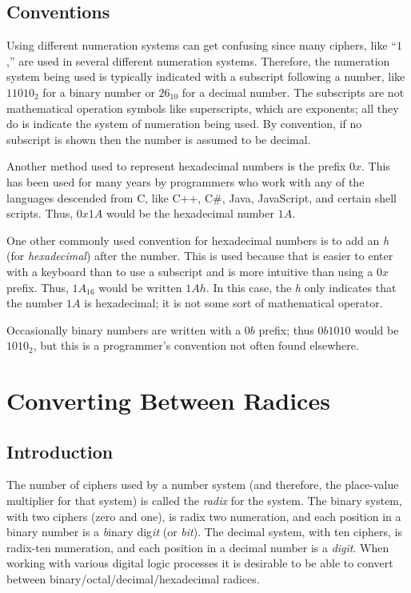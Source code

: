 \subsection{Conventions}
\label{MF:sub:conventions}
Using different numeration systems can get confusing since many ciphers, like ``$ 1 $,'' are used in several different numeration systems. Therefore, the numeration system being used is typically indicated with a subscript following a number, like $ 11010_{2} $ for a binary number or $ 26_{10} $ for a decimal number. The subscripts are not mathematical operation symbols like superscripts, which are exponents; all they do is indicate the system of numeration being used. By convention, if no subscript is shown then the number is assumed to be decimal.

Another method used to represent hexadecimal numbers is the prefix $ 0x $. This has been used for many years by programmers who work with any of the languages descended from C, like C++, C\#, Java, JavaScript, and certain shell scripts. Thus, $ 0x1A $ would be the hexadecimal number $ 1A $.

One other commonly used convention for hexadecimal numbers is to add an \emph{h} (for \emph{hexadecimal}) after the number. This is used because that is easier to enter with a keyboard than to use a subscript and is more intuitive than using a $ 0x $ prefix. Thus, $ 1A_{16} $ would be written $ 1Ah $. In this case, the \emph{h} only indicates that the number $ 1A $ is hexadecimal; it is not some sort of mathematical operator.

Occasionally binary numbers are written with a $ 0b $ prefix; thus $ 0b1010 $ would be $ 1010_{2} $, but this is a programmer's convention not often found elsewhere.

\section{Converting Between Radices}
\label{MF:sec:converting_between_bases}

\subsection{Introduction}
\label{MF:sub:introduction_converting_between_bases}

The number of ciphers used by a number system (and therefore, the place-value multiplier for that system) is called the \emph{radix} for the system. The binary system, with two ciphers (zero and one), is radix two numeration, and each position in a binary number is a \emph{b}inary dig\emph{it} (or \emph{bit}). The decimal system, with ten ciphers, is radix-ten numeration, and each position in a decimal number is a \emph{digit}. When working with various digital logic processes it is desirable to be able to convert between binary/octal/decimal/hexadecimal radices.

